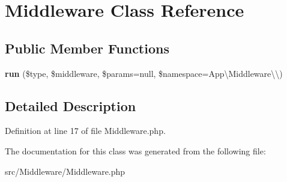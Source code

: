 \hypertarget{class_zest_1_1_middleware_1_1_middleware}{}\section{Middleware Class Reference}
\label{class_zest_1_1_middleware_1_1_middleware}
\subsection*{Public Member Functions}
\begin{DoxyCompactItemize}
\item 
\mbox{\label{class_zest_1_1_middleware_1_1_middleware_ab39641ab8fba38967c9fe0dd8529de31}} 
{\bfseries run} (\$type, \$middleware, \$params=\textquotesingle{}null\textquotesingle{}, \$namespace=\textquotesingle{}App\textbackslash{}\+Middleware\textbackslash{}\textbackslash{}\textquotesingle{})
\end{DoxyCompactItemize}


\subsection{Detailed Description}


Definition at line 17 of file Middleware.\+php.



The documentation for this class was generated from the following file\+:\begin{DoxyCompactItemize}
\item 
src/\+Middleware/Middleware.\+php\end{DoxyCompactItemize}
